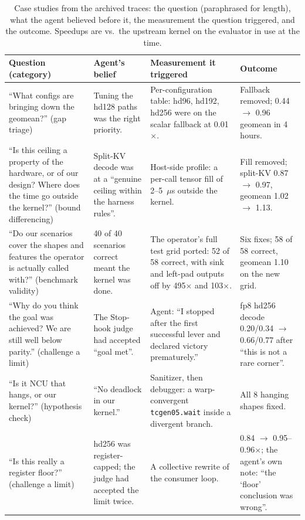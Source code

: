 \begin{table}[t]
\centering\small
\caption{Case studies from the archived traces: the question (paraphrased for length), what the
agent believed before it, the measurement the question triggered, and the outcome. Speedups are
vs.\ the upstream kernel on the evaluator in use at the time.}
\label{tab:cases}
\setlength{\tabcolsep}{4pt}\footnotesize
\begin{tabular}{@{}p{}p{}p{}p{}@{}}
\toprule
Question (category) & Agent's belief & Measurement it triggered & Outcome \\
\midrule
``What configs are bringing down the geomean?'' (gap triage) &
Tuning the hd128 paths was the right priority. &
Per-configuration table: hd96, hd192, hd256 were on the scalar fallback at 0.01$\times$. &
Fallback removed; 0.44 $\to$ 0.96 geomean in 4 hours. \\
\addlinespace
``Is this ceiling a property of the hardware, or of our design? Where does the time go outside the kernel?'' (bound differencing) &
Split-KV decode was at a ``genuine ceiling within the harness rules''. &
Host-side profile: a per-call tensor fill of 2--5~$\mu$s outside the kernel. &
Fill removed; split-KV 0.87 $\to$ 0.97, geomean 1.02 $\to$ 1.13. \\
\addlinespace
``Do our scenarios cover the shapes and features the operator is actually called with?'' (benchmark validity) &
40 of 40 scenarios correct meant the kernel was done. &
The operator's full test grid ported: 52 of 58 correct, with sink and left-pad outputs off by 495$\times$ and 103$\times$. &
Six fixes; 58 of 58 correct, geomean 1.10 on the new grid. \\
\addlinespace
``Why do you think the goal was achieved? We are still well below parity.'' (challenge a limit) &
The Stop-hook judge had accepted ``goal met''. &
Agent: ``I stopped after the first successful lever and declared victory prematurely.'' &
fp8 hd256 decode 0.20/0.34 $\to$ 0.66/0.77 after ``this is not a rare corner''. \\
\addlinespace
``Is it NCU that hangs, or our kernel?'' (hypothesis check) &
``No deadlock in our kernel.'' &
Sanitizer, then debugger: a warp-convergent \texttt{tcgen05.wait} inside a divergent branch. &
All 8 hanging shapes fixed. \\
\addlinespace
``Is this really a register floor?'' (challenge a limit) &
hd256 was register-capped; the judge had accepted the limit twice. &
A collective rewrite of the consumer loop. &
0.84 $\to$ 0.95--0.96$\times$; the agent's own note: ``the `floor' conclusion was wrong''. \\
\bottomrule
\end{tabular}
\end{table}

